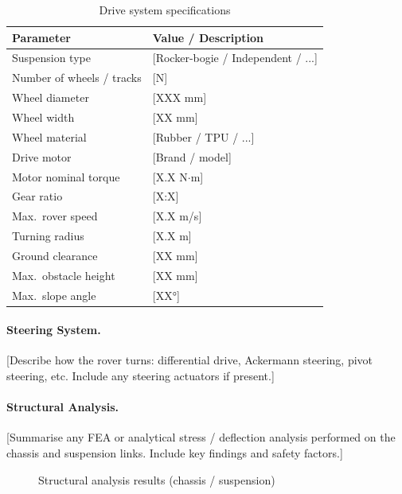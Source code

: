 \begin{table}[H]
    \centering
    \caption{Drive system specifications}
    \label{tab:suspension_drive}
    \begin{tabular}{L{5cm} L{7cm}}
        \toprule
        \textbf{Parameter}         & \textbf{Value / Description} \\
        \midrule
        Suspension type            & [Rocker-bogie / Independent / ...] \\
        Number of wheels / tracks  & [N] \\
        Wheel diameter             & [XXX mm] \\
        Wheel width                & [XX mm] \\
        Wheel material             & [Rubber / TPU / ...] \\
        Drive motor                & [Brand / model] \\
        Motor nominal torque       & [X.X N$\cdot$m] \\
        Gear ratio                 & [X:X] \\
        Max.\ rover speed          & [X.X m/s] \\
        Turning radius             & [X.X m] \\
        Ground clearance           & [XX mm] \\
        Max.\ obstacle height      & [XX mm] \\
        Max.\ slope angle          & [XX°] \\
        \bottomrule
    \end{tabular}
\end{table}

\paragraph{Steering System.}
[Describe how the rover turns: differential drive, Ackermann steering, pivot
steering, etc. Include any steering actuators if present.]

\paragraph{Structural Analysis.}
[Summarise any FEA or analytical stress / deflection analysis performed on the
chassis and suspension links. Include key findings and safety factors.]

\begin{figure}[H]
    \centering
    \caption{Structural analysis results (chassis / suspension)}
    \label{fig:suspension_fea}
\end{figure}
